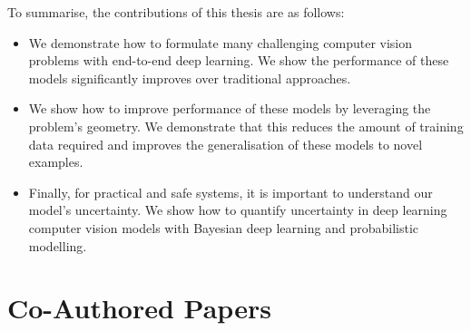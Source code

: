 To summarise, the contributions of this thesis are as follows:
\begin{itemize}
\item We demonstrate how to formulate many challenging computer vision problems with end-to-end deep learning. We show the performance of these models significantly improves over traditional approaches.
\item We show how to improve performance of these models by leveraging the problem's geometry. We demonstrate that this reduces the amount of training data required and improves the generalisation of these models to novel examples.
\item Finally, for practical and safe systems, it is important to understand our model’s uncertainty. We show how to quantify uncertainty in deep learning computer vision models with Bayesian deep learning and probabilistic modelling.
\end{itemize}

\section{Co-Authored Papers}

